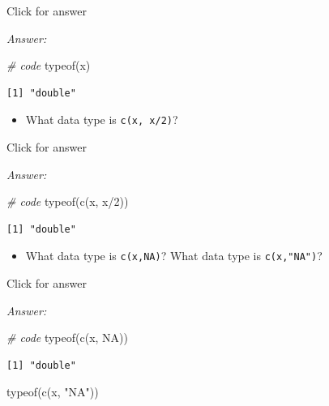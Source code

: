 \documentclass[
]{book}
\newenvironment{Shaded}{\begin{snugshade}}{\end{snugshade}}
\newcommand{\CommentTok}[1]{\textcolor[rgb]{0.56,0.35,0.01}{\textit{#1}}}
\newcommand{\ConstantTok}[1]{\textcolor[rgb]{0.00,0.00,0.00}{#1}}
\newcommand{\DecValTok}[1]{\textcolor[rgb]{0.00,0.00,0.81}{#1}}
\newcommand{\FunctionTok}[1]{\textcolor[rgb]{0.00,0.00,0.00}{#1}}
\newcommand{\NormalTok}[1]{#1}
\newcommand{\SpecialCharTok}[1]{\textcolor[rgb]{0.00,0.00,0.00}{#1}}
\newcommand{\StringTok}[1]{\textcolor[rgb]{0.31,0.60,0.02}{#1}}
\providecommand{\tightlist}{%
  \setlength{\itemsep}{0pt}\setlength{\parskip}{0pt}}
\begin{document}
Click for answer

\emph{Answer:}

\begin{Shaded}
\begin{Highlighting}[]
\CommentTok{\# code}
\FunctionTok{typeof}\NormalTok{(x)}
\end{Highlighting}
\end{Shaded}

\begin{verbatim}
[1] "double"
\end{verbatim}

\begin{itemize}
\tightlist
\item
  What data type is \texttt{c(x,\ x/2)}?
\end{itemize}

Click for answer

\emph{Answer:}

\begin{Shaded}
\begin{Highlighting}[]
\CommentTok{\# code}
\FunctionTok{typeof}\NormalTok{(}\FunctionTok{c}\NormalTok{(x, x}\SpecialCharTok{/}\DecValTok{2}\NormalTok{))}
\end{Highlighting}
\end{Shaded}

\begin{verbatim}
[1] "double"
\end{verbatim}

\begin{itemize}
\tightlist
\item
  What data type is \texttt{c(x,NA)}? What data type is \texttt{c(x,"NA")}?
\end{itemize}

Click for answer

\emph{Answer:}

\begin{Shaded}
\begin{Highlighting}[]
\CommentTok{\# code}
\FunctionTok{typeof}\NormalTok{(}\FunctionTok{c}\NormalTok{(x, }\ConstantTok{NA}\NormalTok{))}
\end{Highlighting}
\end{Shaded}

\begin{verbatim}
[1] "double"
\end{verbatim}

\begin{Shaded}
\begin{Highlighting}[]
\FunctionTok{typeof}\NormalTok{(}\FunctionTok{c}\NormalTok{(x, }\StringTok{"NA"}\NormalTok{))}
\end{Highlighting}
\end{Shaded}
\end{document}
